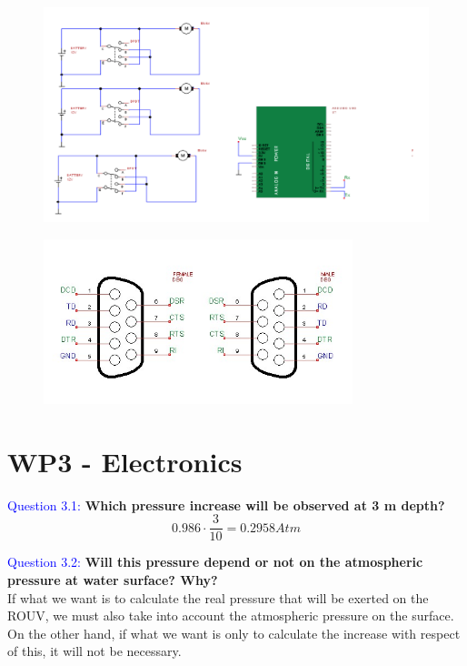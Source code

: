 \documentclass[12pt, a4papre]{article}
\begin{document}
	\begin{figure}[H]
		\begin{center}
		\includegraphics[width=150mm]{Cirquit2WP2.png}
		\end{center}
	\end{figure}
	\begin{figure}[H]
		\begin{center}
		\includegraphics[width=90mm]{DB9Subs.jpeg}
		\end{center}
	\end{figure}
	
	\newpage
	\section{WP3 - Electronics}

	\textcolor{blue}{Question 3.1:} \textbf{Which pressure increase will be observed at 3 m depth?}
	\[
		0.986\cdot\frac{3}{10} = 0.2958 Atm
	\]

	\textcolor{blue}{Question 3.2:} \textbf{Will this pressure depend or not on the atmospheric pressure at water surface? Why?}\\
	
		If what we want is to calculate the real pressure that will be exerted on the ROUV, we must also take into account the atmospheric pressure on the surface. On the other hand, if what we want is only to calculate the increase with respect of this, it will not be necessary.\\
	
\end{document}
